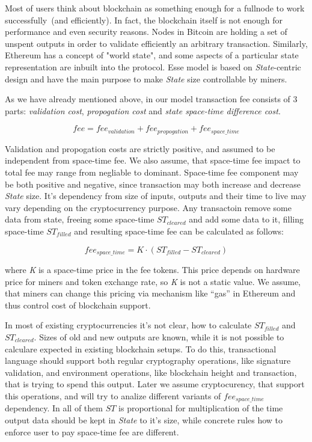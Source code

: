 \documentclass[]{article}   %
\newcommand{\authnote}[2]{\marginpar{\parbox{\marginparwidth}{\tiny %
  \textsf{#1 {\textcolor{blue}{notes: #2}}}}}%
  \textcolor{blue}{\textbf{\dag}}}
\newcommand{\authnote}[2]{
  \textsf{#1 \textcolor{blue}{: #2}}}
\newcommand{\authnote}[2]{}
\newcommand{\dnote}[1]{{\authnote{\textcolor{blue}{Dima notes}}{#1}}}
\newcommand{\esse}{Esse}
\newcommand{\state}{\textit{State}}
\begin{document}
Most of users think about blockchain as something enough for a fullnode to work successfully~(and efficiently). In fact, the blockchain itself is not enough for performance and even security reasons. Nodes in Bitcoin are holding a set of unspent outputs in order to validate efficiently an arbitrary transaction. Similarly, Ethereum\cite{ethyp} has a concept of "world state", and some aspects of a particular state representation are inbuilt into the protocol. \esse{} model is based on \state{}-centric design and have the main purpose to make \state{} size controllable by miners.

As we have already mentioned above, in our model transaction fee consists of 3 parts: \textit{validation cost}, \textit{propogation cost} and \textit{state space-time difference cost}.

\begin{equation}
fee = fee_{validation} + fee_{propogation} + fee_{space\_time}
\end{equation}

 \dnote{should we require from total fee to be positive?}

Validation and propogation costs are strictly positive, and assumed to be independent from space-time fee. We also assume, that space-time fee impact to total fee may range from negliable to dominant. Space-time fee component may be both positive and negative, since transaction may both increase and decrease \state{} size. It's dependency from size of inputs, outputs and their time to live may vary depending on the cryptocurrency purpose. Any transactoin remove some data from state, freeing some space-time \textit{$ST_{cleared}$} and add some data to it, filling space-time \textit{$ST_{filled}$} and resulting space-time fee can be calculated as follows:

\begin{equation}
fee_{space\_time} = K \cdot (ST_{filled} - ST_{cleared})
\end{equation}

where \textit{K} is a space-time price in the fee tokens. This price depends on hardware price for miners and token exchange rate, so \textit{K} is not a static value. We assume, that miners can change this pricing via mechanism like ``gas'' in Ethereum and thus control cost of blockchain support.

In most of existing cryptocurrencies it's not clear, how to calculate \textit{$ST_{filled}$} and \textit{$ST_{cleared}$}. Sizes of old and new outputs are known, while it is not possible to calculare expected in existing blockchain setups. To do this, transactional language should support both regular cryptography operations, like signature validation, and environment operations, like blockchain height and transaction, that is trying to spend this output. Later we assume cryptocurency, that support this operations, and will try to analize different variants of \textit{$fee_{space\_time}$} dependency. In all of them \textit{$ST$} is proportional for multiplication of the time output data should be kept in \state{} to it's size, while concrete rules how to enforce user to pay space-time fee are different.
\end{document}
